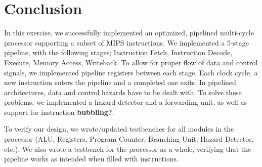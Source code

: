 \chapter{Conclusion}

In this exercise, we successfully implemented an optimized, pipelined multi-cycle processor supporting a subset of MIPS instructions.
We implemented a 5-stage pipeline, with the following stages; Instruction Fetch, Instruction Decode, Execute, Memory Access, Writeback.
To allow for proper flow of data and control signals, we implemented pipeline registers between each stage.
Each clock cycle, a new instruction enters the pipeline and a completed one exits.
In pipelined architectures, data and control hazards have to be dealt with.
To solve these problems, we implemented a hazard detector and a forwarding unit, as well as support for instruction \textbf{bubbling?}.

To verify our design, we wrote/updated testbenches for all modules in the processor (ALU, Registers, Program Counter, Branching Unit, Hazard Detector, etc.).
We also wrote a testbench for the processor as a whole, verifying that the pipeline works as intended when filled with instructions.
